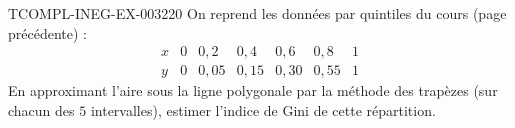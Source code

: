 \begin{exercice}{TCOMPL-INEG-EX-003}{2}{20}
On reprend les données par quintiles du cours (page précédente) :
\[
\begin{array}{c|cccccc}
  x & 0 & 0{,}2 & 0{,}4 & 0{,}6 & 0{,}8 & 1 \\
  \hline
  y & 0 & 0{,}05 & 0{,}15 & 0{,}30 & 0{,}55 & 1
\end{array}
\]
En approximant l'aire sous la ligne polygonale par la méthode des trapèzes (sur chacun des $5$ intervalles), estimer l'indice de Gini de cette répartition.
\end{exercice}
